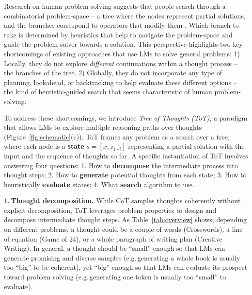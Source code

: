 \documentclass{article}
\begin{document}
Research on human problem-solving suggests that people search through a combinatorial problem-space -- a tree where the nodes represent partial solutions, and the branches correspond to operators that modify them \cite{newell1959report,newell1972human}. Which branch to take is determined by heuristics that help to navigate the problem-space and guide the problem-solver towards a solution. This perspective highlights two key shortcomings of existing approaches that use LMs to solve general problems: 1) Locally, they do not explore {\em different} continuations within a thought process -- the branches of the tree. 2) Globally, they do not incorporate any type of planning, lookahead, or backtracking to help evaluate these different options %
-- the kind of heuristic-guided search that seems characteristic of human problem-solving. 

To address these shortcomings, we introduce \emph{Tree of Thoughts (ToT)}, a paradigm that allows LMs to explore multiple reasoning paths over thoughts (Figure~\ref{fig:schematic}(c)). ToT frames any problem as a search over a tree, where each node is a \textbf{state} $s = [x, z_{1 \cdots i}]$ representing a partial solution with the input and the sequence of thoughts so far.  A specific instantiation of ToT involves answering four questions: 1. How to \textbf{decompose}  the intermediate process into thought steps; 2. How to \textbf{generate} potential thoughts from each state; 3. How to heuristically \textbf{evaluate} states; 4. What \textbf{search} algorithm to use. 





\textbf{1.\,Thought decomposition.} While CoT samples thoughts coherently without explicit decomposition, ToT leverages problem properties to design and decompose intermediate thought steps. As Table~\ref{tab:overview} shows, depending on different problems, a thought could be a couple of words (Crosswords), a line of equation (Game of 24), or a whole paragraph of writing plan (Creative Writing). In general, a thought should be ``small'' enough so that LMs can generate promising and diverse samples (e.g.\,generating a whole book is usually too ``big'' to be coherent), yet ``big'' enough so that LMs can evaluate its prospect toward problem solving (e.g.\,generating one token is usually too ``small'' to evaluate). %
\end{document}
